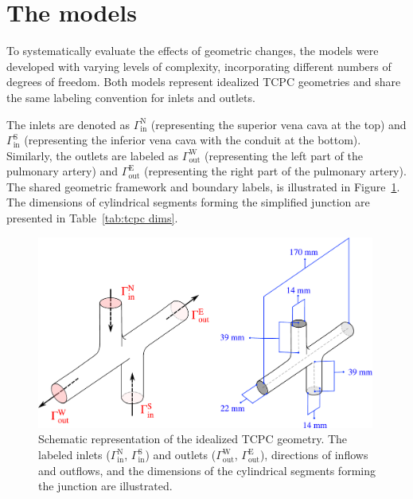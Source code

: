\section{The models}

To systematically evaluate the effects of geometric changes, the models were developed with varying levels of complexity, incorporating different numbers of degrees of freedom. Both models represent idealized TCPC geometries and share the same labeling convention for inlets and outlets. 

The inlets are denoted as $\Gamma^{\text{N}}_{\text{in}}$ (representing the superior vena cava at the top) and $\Gamma^{\text{S}}_{\text{in}}$ (representing the inferior vena cava with the conduit at the bottom). Similarly, the outlets are labeled as $\Gamma^{\text{W}}_{\text{out}}$ (representing the left part of the pulmonary artery) and $\Gamma^{\text{E}}_{\text{out}}$ (representing the right part of the pulmonary artery).
The shared geometric framework and boundary labels, is illustrated in Figure~\ref{fig:junction schema}. The dimensions of cylindrical segments forming the simplified junction are presented in Table~\ref{tab:tcpc dims}.


\begin{figure}[H]
	\centering
	\vspace{2mm}
	\includegraphics[width=0.99\textwidth]{figures/3d-tcpc-schema-combined.pdf}
	\vspace{7mm}
	\caption{Schematic representation of the idealized TCPC geometry. The labeled inlets ($\Gamma^{\text{N}}_{\text{in}}$, $\Gamma^{\text{S}}_{\text{in}}$) and outlets ($\Gamma^{\text{W}}_{\text{out}}$, $\Gamma^{\text{E}}_{\text{out}}$), directions of inflows and outflows, and the dimensions of the cylindrical segments forming the junction are illustrated.}
	\label{fig:junction schema}
\end{figure}

